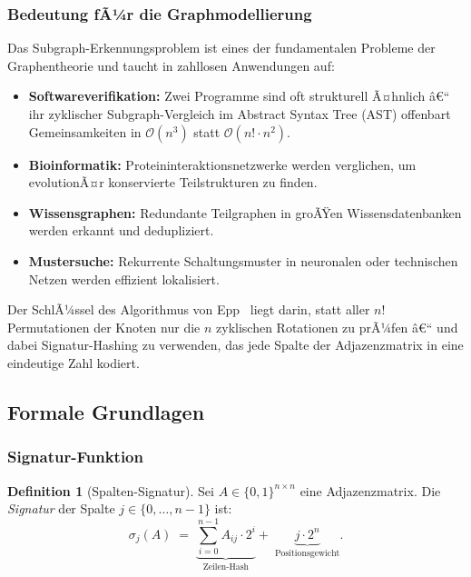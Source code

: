 ﻿\documentclass[12pt,a4paper,twoside]{article}
\theoremstyle{definition}
\newtheorem{definition}{Definition}[section]
\theoremstyle{plain}
\theoremstyle{remark}
\begin{document}
\subsubsection{Bedeutung fÃ¼r die Graphmodellierung}

Das Subgraph-Erkennungsproblem ist eines der fundamentalen
Probleme der Graphentheorie und taucht in zahllosen
Anwendungen auf:
\begin{itemize}
  \item \textbf{Softwareverifikation:} Zwei Programme sind
        oft strukturell Ã¤hnlich â€“ ihr zyklischer Subgraph-Vergleich
        im Abstract Syntax Tree (AST) offenbart Gemeinsamkeiten in
        $\mathcal{O}(n^3)$ statt $\mathcal{O}(n! \cdot n^2)$.
  \item \textbf{Bioinformatik:} Proteininteraktionsnetzwerke
        werden verglichen, um evolutionÃ¤r konservierte Teilstrukturen
        zu finden.
  \item \textbf{Wissensgraphen:} Redundante Teilgraphen in groÃŸen
        Wissensdatenbanken werden erkannt und dedupliziert.
  \item \textbf{Mustersuche:} Rekurrente Schaltungsmuster in
        neuronalen oder technischen Netzen werden effizient lokalisiert.
\end{itemize}

Der SchlÃ¼ssel des Algorithmus von Epp~\cite{Epp2026} liegt darin,
statt aller $n!$ Permutationen der Knoten nur die $n$ zyklischen
Rotationen zu prÃ¼fen â€“ und dabei Signatur-Hashing zu verwenden,
das jede Spalte der Adjazenzmatrix in eine eindeutige Zahl
kodiert.

\subsection{Formale Grundlagen}
\label{sub:sa_grundlagen}

\subsubsection{Signatur-Funktion}

\begin{definition}[Spalten-Signatur]
Sei $A \in \{0,1\}^{n \times n}$ eine Adjazenzmatrix.
Die \emph{Signatur} der Spalte $j \in \{0,\ldots,n{-}1\}$
ist:
\[
  \sigma_j(A) \;=\;
  \underbrace{\sum_{i=0}^{n-1} A_{ij} \cdot 2^i}_{\text{Zeilen-Hash}}
  +\;
  \underbrace{j \cdot 2^n}_{\text{Positionsgewicht}}.
\]
\end{definition}
\end{document}
